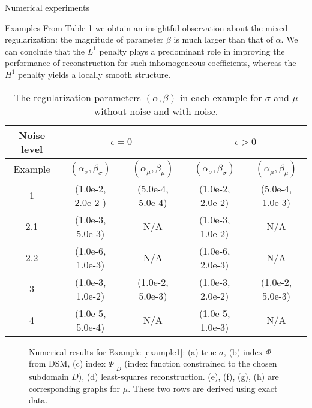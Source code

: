 \documentclass[11pt]{article}%
\renewcommand{\_}{{\fontfamily{ptm}\selectfont\textunderscore}}
\theoremstyle{plain}
\numberwithin{equation}{section}
\begin{document}
\begin{section}{Numerical experiments}
\begin{subsection}{Examples}
From Table \ref{table1} we obtain an insightful observation about the mixed regularization: the magnitude of parameter $\beta$ is much larger than that of $\alpha$.
We can conclude that the $L^1$ penalty plays a predominant role in improving the performance of reconstruction for such inhomogeneous coefficients, whereas the $H^1$ penalty yields a locally smooth structure.




\begin{table}\label{table1}
\centering
\begin{tabular}{c || c c || c c}
\hline
Noise level & \multicolumn{2}{c}{$\epsilon=0$} & \multicolumn{2}{c}{$\epsilon > 0$} \\
\hline
Example & $(\alpha_\sigma, \beta_\sigma)$ & $(\alpha_\mu, \beta_\mu)$ & $(\alpha_\sigma, \beta_\sigma)$ & $(\alpha_\mu, \beta_\mu)$ \\
\hline\hline
1 & (1.0e-2, 2.0e-2 ) & (5.0e-4, 5.0e-4) & (1.0e-2, 2.0e-2) & (5.0e-4, 1.0e-3) \\
2.1 & (1.0e-3, 5.0e-3) & N/A & (1.0e-3, 1.0e-2) & N/A \\
2.2 & (1.0e-6, 1.0e-3) & N/A & (1.0e-6, 2.0e-3) & N/A \\
3 & (1.0e-3, 1.0e-2) & (1.0e-2, 5.0e-3) & (1.0e-3, 2.0e-2) & (1.0e-2, 5.0e-3) \\
4 & (1.0e-5, 5.0e-4) & N/A & (1.0e-5, 1.0e-3) & N/A \\
\end{tabular}
\caption{The regularization parameters $(\alpha,\beta)$ in each example for $\sigma$ and $\mu$ without noise and with noise. }\label{table1}
\end{table}

\begin{figure}[ht!]
\centering
{}
\caption{Numerical results for Example \ref{example1}: (a) true $\sigma$, (b) index $\Phi$ from DSM, (c) index $\Phi|_D$ (index function constrained to the chosen subdomain $D$), (d) least-squares reconstruction. (e), (f), (g), (h) are corresponding graphs for $\mu$.  These two rows are derived using exact data. }
\label{Ex123.main}
\end{figure}


\end{subsection}
\end{section}
\end{document}
